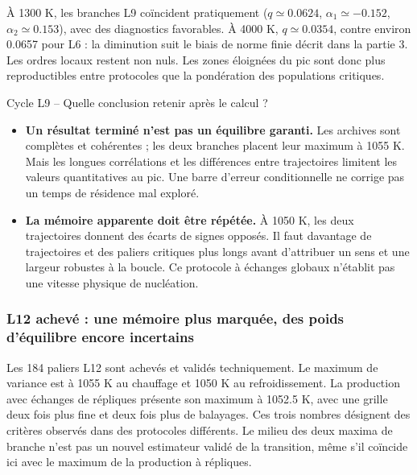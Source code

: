 À 1300 K, les branches L9 coïncident pratiquement ($q\simeq0.0624$, $\alpha_1\simeq-0.152$, $\alpha_2\simeq0.153$), avec des diagnostics favorables. À 4000 K, $q\simeq0.0354$, contre environ 0.0657 pour L6 : la diminution suit le biais de norme finie décrit dans la partie 3. Les ordres locaux restent non nuls. Les zones éloignées du pic sont donc plus reproductibles entre protocoles que la pondération des populations critiques.

\begin{oral}{Cycle L9 -- Quelle conclusion retenir après le calcul ?}

\begin{itemize}

\item \textbf{Un résultat terminé n’est pas un équilibre garanti.} Les archives sont complètes et cohérentes ; les deux branches placent leur maximum à 1055 K. Mais les longues corrélations et les différences entre trajectoires limitent les valeurs quantitatives au pic. Une barre d’erreur conditionnelle ne corrige pas un temps de résidence mal exploré.

\item \textbf{La mémoire apparente doit être répétée.} À 1050 K, les deux trajectoires donnent des écarts de signes opposés. Il faut davantage de trajectoires et des paliers critiques plus longs avant d’attribuer un sens et une largeur robustes à la boucle. Ce protocole à échanges globaux n’établit pas une vitesse physique de nucléation.

\end{itemize}\end{oral}

\subsubsection{L12 achevé : une mémoire plus marquée, des poids d’équilibre encore incertains}

Les 184 paliers L12 sont achevés et validés techniquement. Le maximum de variance est à 1055 K au chauffage et 1050 K au refroidissement. La production avec échanges de répliques présente son maximum à 1052.5 K, avec une grille deux fois plus fine et deux fois plus de balayages. Ces trois nombres désignent des critères observés dans des protocoles différents. Le milieu des deux maxima de branche n’est pas un nouvel estimateur validé de la transition, même s’il coïncide ici avec le maximum de la production à répliques.


